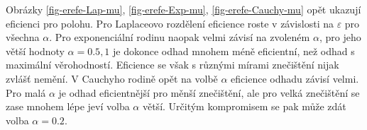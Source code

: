 Obrázky \ref{fig-erefe-Lap-mu}, \ref{fig-erefe-Exp-mu}, \ref{fig-erefe-Cauchy-mu} opět ukazují eficienci pro polohu. Pro Laplaceovo rozdělení eficience roste v závislosti na $\varepsilon$ pro všechna $\alpha$. Pro exponenciální rodinu naopak velmi závisí na zvoleném $\alpha$, pro jeho větší hodnoty $\alpha = 0.5, 1$ je dokonce odhad mnohem méně eficientní, než odhad s maximální věrohodností. Eficience se však s různými mírami znečištění nijak zvlášť nemění. V Cauchyho rodině opět na volbě $\alpha$ eficience odhadu závisí velmi. Pro malá $\alpha$ je odhad eficientnější pro měnší znečištění, ale pro velká znečištění se zase mnohem lépe jeví volba $\alpha$ větší. Určitým kompromisem se pak může zdát volba $\alpha = 0.2$.

